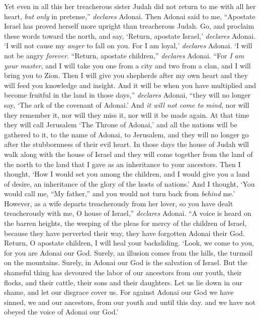\begin{biblechapter}
\verse Yet even in all this her treacherous sister Judah did not return to me with all her heart, \textit{but only} in pretense,” \textit{declares} Adonai.
 Then Adonai said to me, “Apostate Israel has proved herself more upright than treacherous Judah.
\verse Go, and proclaim these words toward the north, and say,
\verse ‘Return, apostate Israel,’ \textit{declares} Adonai. 
‘I will not cause my \textit{anger} to fall on you. 
For I am loyal,’ \textit{declares} Adonai. 
‘I will not be angry \textit{forever}.
\verse “Return, apostate children,” \textit{declares} Adonai. “For \textit{I am your master}, and I will take you one from a city and two from a clan, and I will bring you to Zion.
\verse Then I will give you shepherds after my own heart and they will feed you knowledge and insight.
\verse And it will be when you have multiplied and become fruitful in the land in those days,” \textit{declares} Adonai, “they will no longer say, ‘The ark of the covenant of Adonai.’ And \textit{it will not come to mind}, nor will they remember it, nor will they miss it, nor will it be made again.
\verse At that time they will call Jerusalem ‘The Throne of Adonai,’ and all the nations will be gathered to it, to the name of Adonai, to Jerusalem, and they will no longer go after the stubbornness of their evil heart.
\verse In those days the house of Judah will walk along with the house of Israel and they will come together from the land of the north to the land that I gave as an inheritance to your ancestors.
\verse Then I thought, ‘How I would set you among the children, 
and I would give you a land of desire, 
an inheritance of the glory of the hosts of nations.’ 
And I thought, ‘You would call me, “My father,” 
and you would not turn back from \textit{behind} me.’
\verse However, as a wife departs treacherously from her lover, 
so you have dealt treacherously with me, 
O house of Israel,” \textit{declares} Adonai.
\verse “A voice is heard on the barren heights, 
the weeping of the pleas for mercy of the children of Israel, 
because they have perverted their way, 
they have forgotten Adonai their God.
\verse Return, O apostate children, 
I will heal your backsliding. 
‘Look, we come to you, 
for you are Adonai our God.
\verse Surely, an illusion comes from the hills, 
the turmoil on the mountains. 
Surely, in Adonai our God 
is the salvation of Israel.
\verse But the shameful thing has devoured 
the labor of our ancestors from our youth, 
their flocks, and their cattle, 
their sons and their daughters.
\verse Let us lie down in our shame, 
and let our disgrace cover us. 
For against Adonai our God we have sinned, 
we and our ancestors, 
from our youth and until this day. 
and we have not obeyed the voice of Adonai our God.’
\end{biblechapter}

